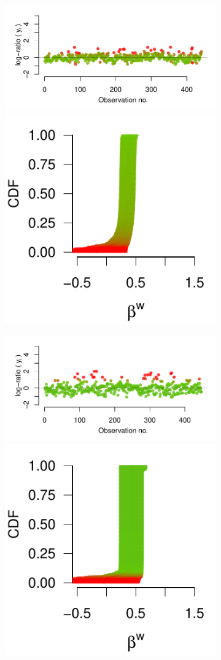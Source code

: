 \documentclass[9pt,a4paper,twocolumn,lineno]{article}
\begin{document}
\begin{figure}
\begin{subfigure}{.49\linewidth}
		{\includegraphics[width=.65\linewidth]{threads/thread_history_148_3}	\includegraphics[width=.33\linewidth]{betas/beta_history_148_3}}
		
		{\includegraphics[width=.65\linewidth]{threads/thread_history_403_9}	\includegraphics[width=.33\linewidth]{betas/beta_history_403_9}}
		

\end{subfigure}
\end{figure}
\end{document}
